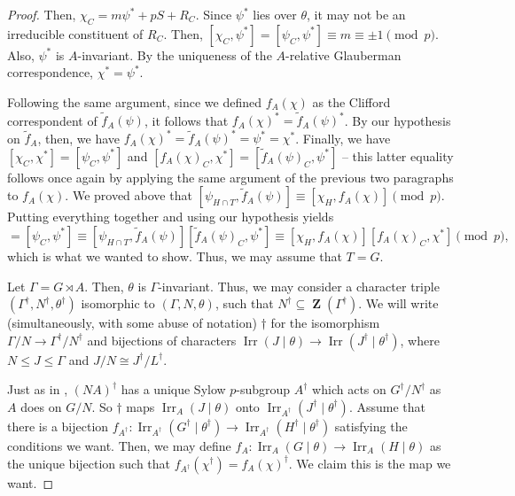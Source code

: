 \documentclass[12pt]{amsart}
\DeclareMathOperator{\ZB}{\mathbf{Z}}
\DeclareMathOperator{\Irr}{Irr}
\theoremstyle{remark}
\theoremstyle{definition}
\theoremstyle{plain}
\theoremstyle{definition}
\numberwithin{equation}{section}
\begin{document}
\begin{proof}
	Then, $\chi_C = m\psi^* + pS + R_C$. Since $\psi^*$ lies over $\theta$, it may not be an irreducible constituent of $R_C$. Then, $[\chi_C, \psi^*] = [\psi_C, \psi^*] \equiv m \equiv \pm 1 \pmod{p}$. Also, $\psi^*$ is $A$-invariant. By the uniqueness of the $A$-relative Glauberman correspondence, $\chi^* = \psi^*$. 
	
	Following the same argument, since we defined $f_A(\chi)$ as the Clifford correspondent of $\tilde{f}_A(\psi)$, it follows that $f_A(\chi)^* = \tilde{f}_A(\psi)^*$. By our hypothesis on $\tilde{f}_A$, then, we have $f_A(\chi)^* = \tilde{f}_A(\psi)^* = \psi^* = \chi^*$. Finally, we have $[\chi_C, \chi^*] = [\psi_C, \psi^*]$ and $[f_A(\chi)_C, \chi^*] = [\tilde{f}_A(\psi)_C, \psi^*]$ -- this latter equality follows once again by applying the same argument of the previous two paragraphs to $f_A(\chi)$. We proved above that $[\psi_{H \cap T}, \tilde{f}_A(\psi)] \equiv [\chi_H, f_A(\chi)] \pmod{p}$. Putting everything together and using our hypothesis yields
	\begin{equation*}
		[\chi_C, \chi^*] = [\psi_C, \psi^*] \equiv [\psi_{H \cap T}, \tilde{f}_A(\psi)][\tilde{f}_A(\psi)_C, \psi^*] \equiv [\chi_H, f_A(\chi)][f_A(\chi)_C, \chi^*] \pmod{p},
	\end{equation*}
	which is what we wanted to show. Thus, we may assume that $T = G$.
	
	Let $\Gamma = G\rtimes A$. Then, $\theta$ is $\Gamma$-invariant. Thus, we may consider a character triple $(\Gamma^\dagger, N^\dagger, \theta^\dagger)$ isomorphic to $(\Gamma, N, \theta)$, such that $N^\dagger \subseteq \ZB(\Gamma^\dagger)$. We will write (simultaneously, with some abuse of notation) $\dagger$ for the isomorphism $\Gamma/N \to \Gamma^\dagger/N^\dagger$ and bijections of characters $\Irr(J \mid \theta) \to \Irr(J^\dagger \mid \theta^\dagger)$, where $N \leq J \leq \Gamma$ and $J/N \cong J^\dagger/L^\dagger$.
	
	Just as in \cite[Theorem E]{RelativeGlauberman}, $(NA)^\dagger$ has a unique Sylow $p$-subgroup $A^\dagger$ which acts on $G^\dagger/N^\dagger$ as $A$ does on $G/N$. So $\dagger$ maps $\Irr_A(J \mid \theta)$ onto $\Irr_{A^\dagger}(J^\dagger \mid \theta^\dagger)$. Assume that there is a bijection $f_{A^\dagger}:\Irr_{A^\dagger}(G^\dagger \mid \theta^\dagger) \to \Irr_{A^\dagger}(H^\dagger \mid \theta^\dagger)$ satisfying the conditions we want. Then, we may define $f_A: \Irr_A(G \mid \theta) \to \Irr_A(H \mid \theta)$ as the unique bijection such that $f_{A^\dagger}(\chi^\dagger) = f_A(\chi)^\dagger$. We claim this is the map we want.
	

\end{proof}
\end{document}
